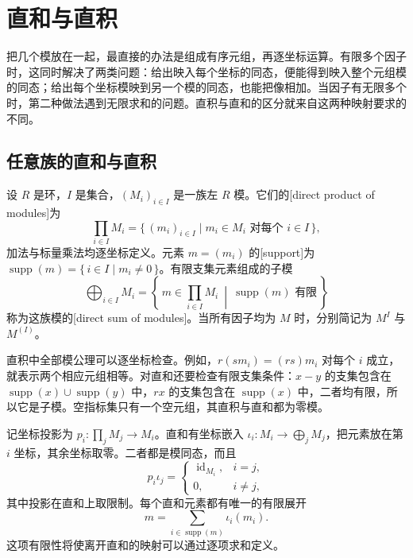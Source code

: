 
\section{直和与直积}
\label{b2:sec:0204}

把几个模放在一起，最直接的办法是组成有序元组，再逐坐标运算。有限多个因子时，这同时解决了两类问题：给出映入每个坐标的同态，便能得到映入整个元组模的同态；给出每个坐标模映到另一个模的同态，也能把像相加。当因子有无限多个时，第二种做法遇到无限求和的问题。直积与直和的区分就来自这两种映射要求的不同。


\subsection{任意族的直和与直积}
\label{b2:subsec:0204:01}

\begin{definition}\label{b2:def:module-product-sum}
	设 \(R\) 是环，\(I\) 是集合，\((M_i)_{i\in I}\) 是一族左 \(R\) 模。它们的[direct product of modules]为
	\[
		\prod_{i\in I}M_i=\{\,(m_i)_{i\in I}\mid m_i\in M_i\text{ 对每个 }i\in I\,\},
	\]
	加法与标量乘法均逐坐标定义。元素 \(m=(m_i)\) 的[support]为 \(\operatorname{supp}(m)=\{\,i\in I\mid m_i\ne0\,\}\)。有限支集元素组成的子模
	\[
		\bigoplus_{i\in I}M_i =\left\{\,m\in\prod_{i\in I}M_i\ \middle|\ \operatorname{supp}(m)\text{ 有限}\,\right\}
	\]
	称为这族模的[direct sum of modules]。当所有因子均为 \(M\) 时，分别简记为 \(M^I\) 与 \(M^{(I)}\)。
\end{definition}

直积中全部模公理可以逐坐标检查。例如，\(r(sm_i)=(rs)m_i\) 对每个 \(i\) 成立，就表示两个相应元组相等。对直和还要检查有限支集条件：\(x-y\) 的支集包含在 \(\operatorname{supp}(x)\cup\operatorname{supp}(y)\) 中，\(rx\) 的支集包含在 \(\operatorname{supp}(x)\) 中，二者均有限，所以它是子模。空指标集只有一个空元组，其直积与直和都为零模。

\ProseParagraphBreak
记坐标投影为 \(p_i:\prod_jM_j\to M_i\)。直和有坐标嵌入 \(\iota_i:M_i\to\bigoplus_jM_j\)，把元素放在第 \(i\) 坐标，其余坐标取零。二者都是模同态，而且
\[
	p_i\iota_j=
	\begin{cases}
		\operatorname{id}_{M_i},&i=j,\\
		0,&i\ne j,
	\end{cases}
\]
其中投影在直和上取限制。每个直和元素都有唯一的有限展开
\[
	m=\sum_{i\in\operatorname{supp}(m)}\iota_i(m_i).
\]
这项有限性将使离开直和的映射可以通过逐项求和定义。

